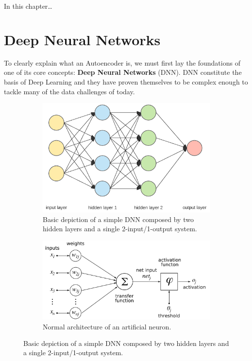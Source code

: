 
In this chapter\ldots


\section{Deep Neural Networks}

To clearly explain what an Autoencoder is, we must first lay the foundations of one of its core concepts: \textbf{Deep Neural Networks} (DNN). DNN constitute the basis of Deep Learning and they have proven themselves to be complex enough to tackle many of the data challenges of today. \par
%
\begin{figure}[H]
	\begin{subfigure}{0.65\linewidth}  
		\centering
		\includegraphics[width=\linewidth]{Figuras_tfg/Figure2_tfg}
		\caption{Basic depiction of a simple DNN composed by two hidden layers and a single 2-input/1-output system.}
		\label{fig:fig2a} 
	\end{subfigure}
	
	\begin{subfigure}{0.65\linewidth} 
		\centering
		\includegraphics[width=\linewidth]{Figuras_tfg/ArtificialNeuronModel_english.png}
		\caption{Normal architecture of an artificial neuron.}
		\label{fig:fig2b} 
	\end{subfigure}
	\caption{Basic depiction of a simple DNN composed by two hidden layers and a single 2-input/1-output system.}
	\label{fig:fig2}
\end{figure}

